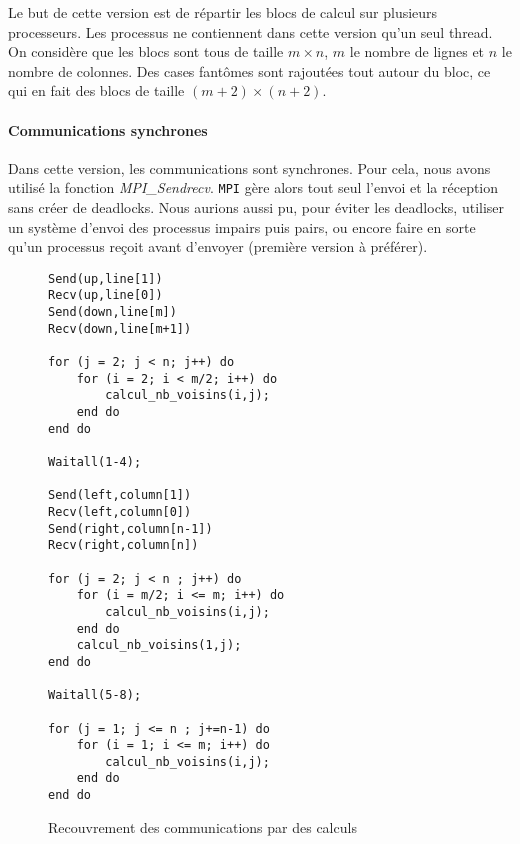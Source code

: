 Le but de cette version est de répartir les blocs de calcul sur plusieurs processeurs. Les processus ne contiennent dans cette version qu'un seul thread. On considère que les blocs sont tous de taille $m \times n$, $m$ le nombre de lignes et $n$ le nombre de colonnes. Des cases fantômes sont rajoutées tout autour du bloc, ce qui en fait des blocs de taille $(m+2) \times (n+2)$.

\paragraph{Communications synchrones}
Dans cette version, les communications sont synchrones. Pour cela, nous avons utilisé la fonction \emph{MPI\_Sendrecv}. \texttt{MPI} gère alors tout seul l'envoi et la réception sans créer de deadlocks. Nous aurions aussi pu, pour éviter les deadlocks, utiliser un système d'envoi des processus impairs puis pairs, ou encore faire en sorte qu'un processus reçoit avant d'envoyer (première version à préférer). 

\begin{figure}[!ht]
\begin{lstlisting}
Send(up,line[1])
Recv(up,line[0])
Send(down,line[m])
Recv(down,line[m+1])

for (j = 2; j < n; j++) do
	for (i = 2; i < m/2; i++) do
		calcul_nb_voisins(i,j);
	end do
end do

Waitall(1-4);

Send(left,column[1])
Recv(left,column[0])
Send(right,column[n-1])
Recv(right,column[n])

for (j = 2; j < n ; j++) do
	for (i = m/2; i <= m; i++) do
		calcul_nb_voisins(i,j);
	end do
	calcul_nb_voisins(1,j);
end do

Waitall(5-8);

for (j = 1; j <= n ; j+=n-1) do
	for (i = 1; i <= m; i++) do
		calcul_nb_voisins(i,j);
	end do
end do
\end{lstlisting}
\caption{Recouvrement des communications par des calculs}
\label{recouvrement}
\end{figure}


